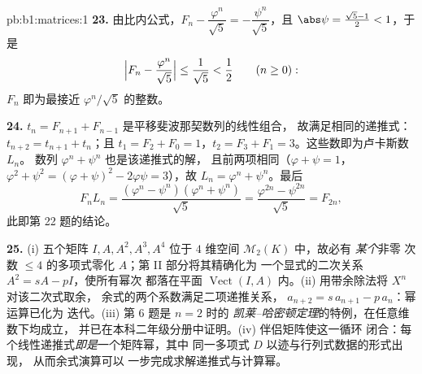 \begin{solution}{pb:b1:matrices:1}
\textbf{23.} 由比内公式，$F_n - \dfrac{\varphi^n}{\sqrt5} =
-\dfrac{\psi^n}{\sqrt5}$，且 $\abs\psi = \frac{\sqrt5 - 1}2 <
1$，于是
\[
\Bigl|F_n - \frac{\varphi^n}{\sqrt5}\Bigr|
\leq \frac{1}{\sqrt5} < \frac12
\qquad (n \geq 0):
\]
$F_n$ 即为最接近 $\varphi^n/\sqrt5$ 的整数。

\textbf{24.} $t_n = F_{n+1} + F_{n-1}$ 是平移斐波那契数列的线性组合，
故满足相同的递推式：
$t_{n+2} = t_{n+1} + t_n$；且 $t_1 = F_2 + F_0 =
1$，$t_2 = F_3 + F_1 = 3$。这些数即为卢卡斯数 $L_n$。
数列 $\varphi^n + \psi^n$ 也是该递推式的解，
且前两项相同（$\varphi + \psi = 1$，$\varphi^2 + \psi^2 = (
\varphi + \psi)^2 - 2\varphi\psi = 3$），故 $L_n = \varphi^n +
\psi^n$。最后
\[
F_n L_n = \frac{(\varphi^n - \psi^n)(\varphi^n +
\psi^n)}{\sqrt5} = \frac{\varphi^{2n} - \psi^{2n}}{\sqrt5} =
F_{2n},
\]
此即第 22 题的结论。

\textbf{25.} (i) 五个矩阵 $I, A, A^2, A^3, A^4$ 位于
$4$ 维空间 $\mathcal{M}_2(K)$ 中，故必有 \emph{某个}非零
次数 $\leq 4$ 的多项式零化 $A$；第 II 部分将其精确化为
一个显式的二次关系 $A^2 = sA - pI$，使所有幂次
都落在平面 $\operatorname{Vect}(I, A)$ 内。(ii)
用带余除法将 $X^n$ 对该二次式取余，
余式的两个系数满足二项递推关系，
$a_{n+2} = s\,a_{n+1} - p\,a_n$：幂运算已化为
迭代。(iii) 第 6 题是 $n = 2$ 时的
\emph{凯莱–哈密顿定理}的特例，在任意维数下均成立，
并已在本科二年级分册中证明。(iv) 伴侣矩阵使这一循环
闭合：每个线性递推式\emph{即是}一个矩阵幂，其中
同一多项式 $D$ 以迹与行列式数据的形式出现，
从而余式演算可以
一步完成求解递推式与计算幂。
\end{solution}
